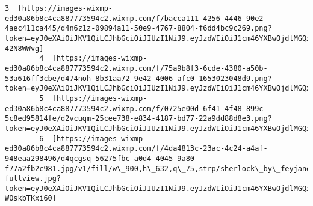\documentclass[11pt]{article}
\begin{document}
\begin{Verbatim}[commandchars=\\\{\}]
        3  [https://images-wixmp-ed30a86b8c4ca887773594c2.wixmp.com/f/bacca111-4256-4446-90e2-4aec411ca445/d4n6z1z-09894a11-50e9-4767-8804-f6dd4bc9c269.png?token=eyJ0eXAiOiJKV1QiLCJhbGciOiJIUzI1NiJ9.eyJzdWIiOiJ1cm46YXBwOjdlMGQxODg5ODIyNjQzNzNhNWYwZDQxNWVhMGQyNmUwIiwiaXNzIjoidXJuOmFwcDo3ZTBkMTg4OTgyMjY0MzczYTVmMGQ0MTVlYTBkMjZlMCIsIm9iaiI6W1t7InBhdGgiOiJcL2ZcL2JhY2NhMTExLTQyNTYtNDQ0Ni05MGUyLTRhZWM0MTFjYTQ0NVwvZDRuNnoxei0wOTg5NGExMS01MGU5LTQ3NjctODgwNC1mNmRkNGJjOWMyNjkucG5nIn1dXSwiYXVkIjpbInVybjpzZXJ2aWNlOmZpbGUuZG93bmxvYWQiXX0.fKxTuklGbcGlYbIM0S\_AAkRVp9MDet\_yMD-42N8WWvg]                                                                                                                                                                   
        4  [https://images-wixmp-ed30a86b8c4ca887773594c2.wixmp.com/f/75a9b8f3-6cde-4380-a50b-53a616ff3cbe/d474noh-8b31aa72-9e42-4006-afc0-1653023048d9.png?token=eyJ0eXAiOiJKV1QiLCJhbGciOiJIUzI1NiJ9.eyJzdWIiOiJ1cm46YXBwOjdlMGQxODg5ODIyNjQzNzNhNWYwZDQxNWVhMGQyNmUwIiwiaXNzIjoidXJuOmFwcDo3ZTBkMTg4OTgyMjY0MzczYTVmMGQ0MTVlYTBkMjZlMCIsIm9iaiI6W1t7InBhdGgiOiJcL2ZcLzc1YTliOGYzLTZjZGUtNDM4MC1hNTBiLTUzYTYxNmZmM2NiZVwvZDQ3NG5vaC04YjMxYWE3Mi05ZTQyLTQwMDYtYWZjMC0xNjUzMDIzMDQ4ZDkucG5nIn1dXSwiYXVkIjpbInVybjpzZXJ2aWNlOmZpbGUuZG93bmxvYWQiXX0.MN8jGrrVbhVG6B5zmQsmyWaGcxPYSTDA7xIItuUn8Ig]                                                                                                                                                                   
        5  [https://images-wixmp-ed30a86b8c4ca887773594c2.wixmp.com/f/0725e00d-6f41-4f48-899c-5c8ed95814fe/d2vcuqm-25cee738-e834-4187-bd77-22a9dd88d8e3.png?token=eyJ0eXAiOiJKV1QiLCJhbGciOiJIUzI1NiJ9.eyJzdWIiOiJ1cm46YXBwOjdlMGQxODg5ODIyNjQzNzNhNWYwZDQxNWVhMGQyNmUwIiwiaXNzIjoidXJuOmFwcDo3ZTBkMTg4OTgyMjY0MzczYTVmMGQ0MTVlYTBkMjZlMCIsIm9iaiI6W1t7InBhdGgiOiJcL2ZcLzA3MjVlMDBkLTZmNDEtNGY0OC04OTljLTVjOGVkOTU4MTRmZVwvZDJ2Y3VxbS0yNWNlZTczOC1lODM0LTQxODctYmQ3Ny0yMmE5ZGQ4OGQ4ZTMucG5nIn1dXSwiYXVkIjpbInVybjpzZXJ2aWNlOmZpbGUuZG93bmxvYWQiXX0.OtN6CRHb7viL9pMiMrg0GvW4PCf3WxIyFp\_6gmhxHx4]                                                                                                                                                                   
        6  [https://images-wixmp-ed30a86b8c4ca887773594c2.wixmp.com/f/4da4813c-23ac-4c24-a4af-948eaa298496/d4qcgsq-56275fbc-a0d4-4045-9a80-f77a2fb2c981.jpg/v1/fill/w\_900,h\_632,q\_75,strp/sherlock\_by\_feyjane\_d4qcgsq-fullview.jpg?token=eyJ0eXAiOiJKV1QiLCJhbGciOiJIUzI1NiJ9.eyJzdWIiOiJ1cm46YXBwOjdlMGQxODg5ODIyNjQzNzNhNWYwZDQxNWVhMGQyNmUwIiwiaXNzIjoidXJuOmFwcDo3ZTBkMTg4OTgyMjY0MzczYTVmMGQ0MTVlYTBkMjZlMCIsIm9iaiI6W1t7ImhlaWdodCI6Ijw9NjMyIiwicGF0aCI6IlwvZlwvNGRhNDgxM2MtMjNhYy00YzI0LWE0YWYtOTQ4ZWFhMjk4NDk2XC9kNHFjZ3NxLTU2Mjc1ZmJjLWEwZDQtNDA0NS05YTgwLWY3N2EyZmIyYzk4MS5qcGciLCJ3aWR0aCI6Ijw9OTAwIn1dXSwiYXVkIjpbInVybjpzZXJ2aWNlOmltYWdlLm9wZXJhdGlvbnMiXX0.NKBehw9Lh1lYIHt8tTQ\_jG08rgbSBEZ-WOskbTKxi60]                                            

\end{Verbatim}
\end{document}
